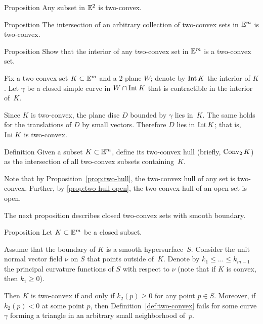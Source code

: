 \begin{thm}{Proposition}
Any subset in $\mathbb{E}^2$ is two-convex.
\end{thm}


\begin{thm}{Proposition}\label{prop:two-hull}
The intersection of an arbitrary collection of two-convex sets in $\mathbb{E}^m$ is two-convex.
\end{thm}

\begin{thm}{Proposition}\label{prop:two-hull-open}
Show that the interior of any two-convex set in $\mathbb{E}^m$ is a two-convex set.
\end{thm}

Fix a  two-convex set $K\subset \mathbb{E}^m$ and a 2-plane $W$;
denote by \index{$\Int$}$\operatorname{\rm Int}\nolimits K$ the interior of $K$.
Let $\gamma$ be a closed simple curve in $W\cap \operatorname{\rm Int}\nolimits K$ 
that  is contractible in the interior of~$K$.

Since $K$ is two-convex,
the plane disc $D$ bounded by $\gamma$ lies in~$K$.
The same holds for the translations of $D$ by small vectors.
Therefore $D$ lies in $\operatorname{\rm Int}\nolimits K$;
that is, $\operatorname{\rm Int}\nolimits K$ is two-convex.
\qeds

\begin{thm}{Definition}
Given a subset $K\subset \mathbb{E}^m$, define its two-convex hull (briefly, $\mathop{\rm Conv}\nolimits_2K$) as the intersection of all two-convex subsets containing~$K$.
\end{thm}

Note that by Proposition~\ref{prop:two-hull},
the two-convex hull of any set is two-convex.
Further, 
by \ref{prop:two-hull-open}, the
two-convex hull of an open set is open.

The next proposition describes  closed two-convex sets with smooth boundary.

\begin{thm}{Proposition}\label{prop:two-cove+smooth}
Let $K\subset \mathbb{E}^m$ be a closed subset.

Assume that the boundary of $K$ is a smooth hypersurface~$S$.
Consider the unit normal vector field $\nu$ on $S$ that  points outside of~$K$.
Denote by $k_1\le \dots\le k_{m-1}$ the principal curvature functions of $S$ with respect to $\nu$ (note that if $K$ is convex, then  $k_1\ge 0$).

Then $K$ is two-convex if and only if $k_2(p)\ge 0$ for any point $p\in S$.
Moreover, if $k_2(p)<0$ at some point $p$, then Definition~\ref{def:two-convex} fails for some curve $\gamma$ forming a triangle in an arbitrary small neighborhood of~$p$.
\end{thm}

